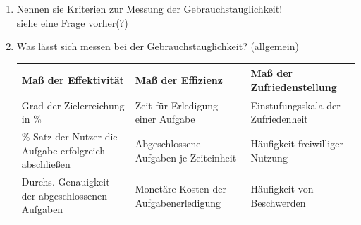 \begin{enumerate}
	\item Nennen sie Kriterien zur Messung der Gebrauchstauglichkeit!\\
	siehe eine Frage vorher(?)
	
	\item Was lässt sich messen bei der Gebrauchstauglichkeit? (allgemein)
	\begin{table}[!h]
		\centering
		\begin{tabular}{|p{13em}|p{13em}|p{13em}|}
			\hline
			\textbf{Maß der Effektivität} & \textbf{Maß der Effizienz} & \textbf{Maß der Zufriedenstellung}\\
			\hline
			Grad der Zielerreichung in \% & Zeit für Erledigung einer Aufgabe & Einstufungsskala der Zufriedenheit\\
			\hline
			\%-Satz der Nutzer die Aufgabe erfolgreich abschließen & Abgeschlossene Aufgaben je Zeiteinheit & Häufigkeit freiwilliger Nutzung\\
			\hline
			Durchs. Genauigkeit der abgeschlossenen Aufgaben & Monetäre Kosten der Aufgabenerledigung & Häufigkeit von Beschwerden\\
			\hline
		\end{tabular}
	\end{table}
	

\end{enumerate}

